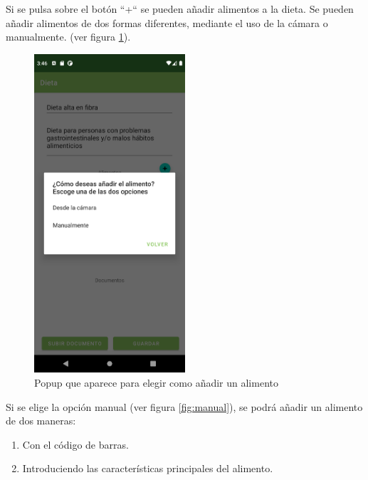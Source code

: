 Si se pulsa sobre el botón ``+`` se pueden añadir alimentos a la dieta. Se pueden añadir alimentos de dos formas diferentes, mediante el uso de la cámara o manualmente. (ver figura \ref{fig:addalim}).
\begin{figure}[H]
    \centering
    \includegraphics[width=0.5\textwidth]{Images/Capitulo7/addalim.png}
        \caption{Popup que aparece para elegir como añadir un alimento}
    \label{fig:addalim}
\end{figure}

Si se elige la opción manual (ver figura \ref{fig:manual}), se podrá añadir un alimento de dos maneras:  
\begin{enumerate}
    \item Con el código de barras.
    \item Introduciendo las características principales del alimento.
\end{enumerate}

